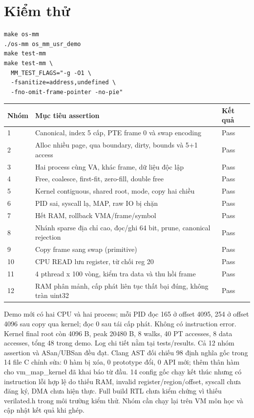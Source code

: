 \documentclass[11pt,a4paper]{article}
\begin{document}
\section{Kiểm thử}
\begin{verbatim}
make os-mm
./os-mm os_mm_usr_demo
make test-mm
make test-mm \
  MM_TEST_FLAGS="-g -O1 \
  -fsanitize=address,undefined \
  -fno-omit-frame-pointer -no-pie"
\end{verbatim}
\begin{longtable}{p{}p{}p{}}
\toprule Nhóm & Mục tiêu assertion & Kết quả\\\midrule
1 & Canonical, index 5 cấp, PTE frame 0 và swap encoding & Pass\\
2 & Alloc nhiều page, qua boundary, dirty, bounds và 5+1 access & Pass\\
3 & Hai process cùng VA, khác frame, dữ liệu độc lập & Pass\\
4 & Free, coalesce, first-fit, zero-fill, double free & Pass\\
5 & Kernel contiguous, shared root, mode, copy hai chiều & Pass\\
6 & PID sai, syscall lạ, MAP, raw IO bị chặn & Pass\\
7 & Hết RAM, rollback VMA/frame/symbol & Pass\\
8 & Nhánh sparse địa chỉ cao, đọc/ghi 64 bit, prune, canonical rejection & Pass\\
9 & Copy frame sang swap (primitive) & Pass\\
10 & CPU READ lưu register, từ chối reg 20 & Pass\\
11 & 4 pthread x 100 vòng, kiểm tra data và thu hồi frame & Pass\\
12 & RAM phân mảnh, cấp phát liên tục thất bại đúng, không tràn uint32 & Pass\\\bottomrule
\end{longtable}
Demo mới có hai CPU và hai process; mỗi PID đọc 165 ở offset 4095, 254 ở offset 4096 sau copy qua kernel; đọc 0 sau tái cấp phát. Không có instruction error. Kernel final root còn 4096 B, peak 20480 B, 8 walks, 40 PT accesses, 8 data accesses, tổng 48 trong demo. Log chi tiết nằm tại tests/results. Cả 12 nhóm assertion và ASan/UBSan đều đạt. Clang AST đối chiếu 98 định nghĩa gốc trong 14 file C chỉnh sửa: 0 hàm bị xóa, 0 prototype đổi, 0 API mới; thêm thân hàm cho vm\_map\_kernel đã khai báo từ đầu. 14 config gốc chạy kết thúc nhưng có instruction lỗi hợp lệ do thiếu RAM, invalid register/region/offset, syscall chưa đăng ký, DMA chưa hiện thực. Full build RTL chưa kiểm chứng vì thiếu verilated.h trong môi trường kiểm thử. Nhóm cần chạy lại trên VM môn học và cập nhật kết quả khi ghép.
\end{document}
